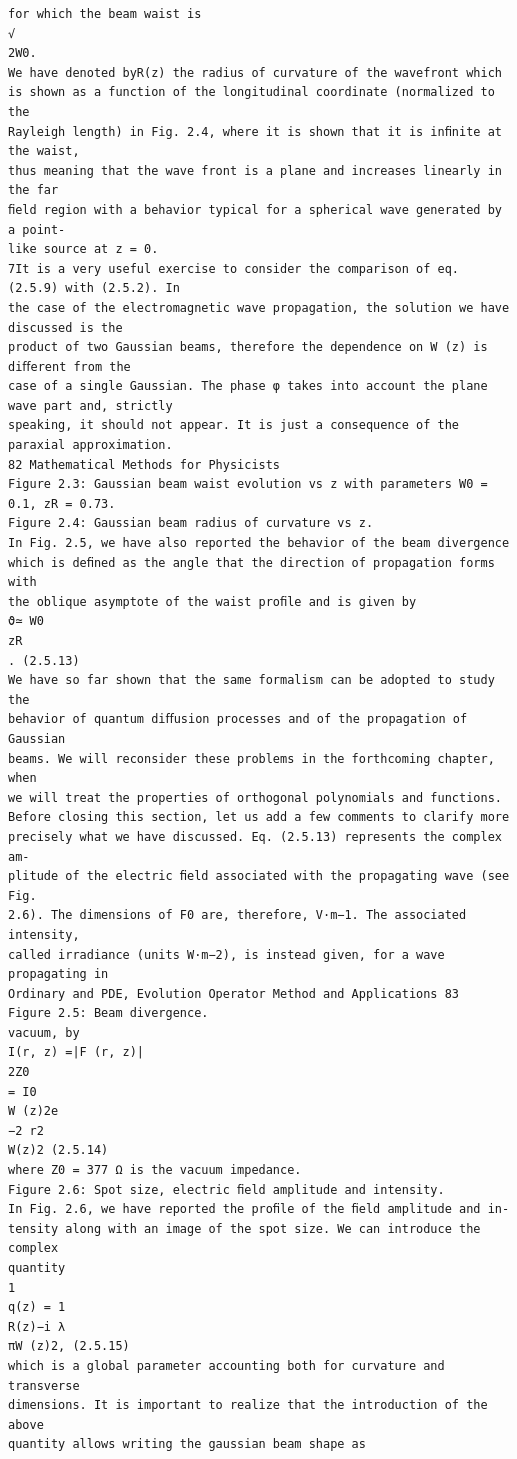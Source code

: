 \begin{verbatim}
for which the beam waist is
√
2W0.
We have denoted byR(z) the radius of curvature of the wavefront which
is shown as a function of the longitudinal coordinate (normalized to the
Rayleigh length) in Fig. 2.4, where it is shown that it is inﬁnite at the waist,
thus meaning that the wave front is a plane and increases linearly in the far
ﬁeld region with a behavior typical for a spherical wave generated by a point-
like source at z = 0.
7It is a very useful exercise to consider the comparison of eq. (2.5.9) with (2.5.2). In
the case of the electromagnetic wave propagation, the solution we have discussed is the
product of two Gaussian beams, therefore the dependence on W (z) is diﬀerent from the
case of a single Gaussian. The phase φ takes into account the plane wave part and, strictly
speaking, it should not appear. It is just a consequence of the paraxial approximation.
82 Mathematical Methods for Physicists
Figure 2.3: Gaussian beam waist evolution vs z with parameters W0 = 0.1, zR = 0.73.
Figure 2.4: Gaussian beam radius of curvature vs z.
In Fig. 2.5, we have also reported the behavior of the beam divergence
which is deﬁned as the angle that the direction of propagation forms with
the oblique asymptote of the waist proﬁle and is given by
ϑ≃ W0
zR
. (2.5.13)
We have so far shown that the same formalism can be adopted to study the
behavior of quantum diﬀusion processes and of the propagation of Gaussian
beams. We will reconsider these problems in the forthcoming chapter, when
we will treat the properties of orthogonal polynomials and functions.
Before closing this section, let us add a few comments to clarify more
precisely what we have discussed. Eq. (2.5.13) represents the complex am-
plitude of the electric ﬁeld associated with the propagating wave (see Fig.
2.6). The dimensions of F0 are, therefore, V·m−1. The associated intensity,
called irradiance (units W·m−2), is instead given, for a wave propagating in
Ordinary and PDE, Evolution Operator Method and Applications 83
Figure 2.5: Beam divergence.
vacuum, by
I(r, z) =|F (r, z)|
2Z0
= I0
W (z)2e
−2 r2
W(z)2 (2.5.14)
where Z0 = 377 Ω is the vacuum impedance.
Figure 2.6: Spot size, electric ﬁeld amplitude and intensity.
In Fig. 2.6, we have reported the proﬁle of the ﬁeld amplitude and in-
tensity along with an image of the spot size. We can introduce the complex
quantity
1
q(z) = 1
R(z)−i λ
πW (z)2, (2.5.15)
which is a global parameter accounting both for curvature and transverse
dimensions. It is important to realize that the introduction of the above
quantity allows writing the gaussian beam shape as

\end{verbatim}
